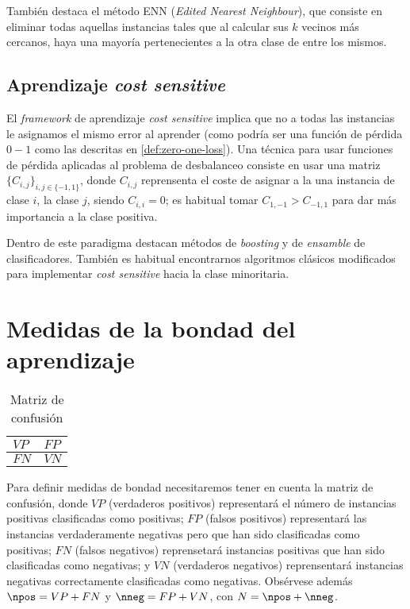 También destaca el método ENN (\textit{Edited Nearest Neighbour}), que consiste en eliminar todas aquellas instancias tales
que al calcular sus $k$ vecinos más cercanos, haya una mayoría pertenecientes a la otra clase de entre los mismos.

\subsection{Aprendizaje \textit{cost sensitive}}

El \textit{framework} de aprendizaje \textit{cost sensitive} implica que no a todas las instancias le asignamos el mismo error
al aprender (como podría ser una función de pérdida $0-1$ como las descritas en \ref{def:zero-one-loss}). Una técnica para usar
funciones de pérdida aplicadas al problema de desbalanceo consiste en usar una matriz $\{C_{i,j}\}_{i,j\in \{-1,1\}}$, 
donde $C_{i,j}$ reprensenta el coste de asignar a la una instancia de clase $i$, la clase $j$, siendo $C_{i,i} = 0$; es habitual
tomar $C_{1,-1} > C_{-1,1}$ para dar más importancia a la clase positiva.

Dentro de este paradigma destacan métodos de \textit{boosting} y de \textit{ensamble} de clasificadores. También es habitual
encontrarnos algoritmos clásicos modificados para implementar \textit{cost sensitive} hacia la clase minoritaria.

\section{Medidas de la bondad del aprendizaje}

\begin{table}[H]
  \centering
  \begin{tabular}{C{3cm}|C{3cm}}
  $VP$ & $FP$\\
  \hline
  $FN$ & $VN$\\
  \end{tabular}
  \caption{Matriz de confusión}
\end{table}

Para definir medidas de bondad necesitaremos tener en cuenta la matriz de confusión, donde $VP$ (verdaderos positivos) 
representará el número de instancias positivas clasificadas como positivas; $FP$ (falsos positivos) representará las instancias
verdaderamente negativas pero que han sido clasificadas como positivas; $FN$ (falsos negativos) reprensetará instancias 
positivas que han sido clasificadas como negativas; y $VN$ (verdaderos negativos) reprensentará instancias negativas
correctamente clasificadas como negativas. Obsérvese además $\npos = VP + FN$ y $\nneg = FP + VN$, con $N = \npos + \nneg$.

